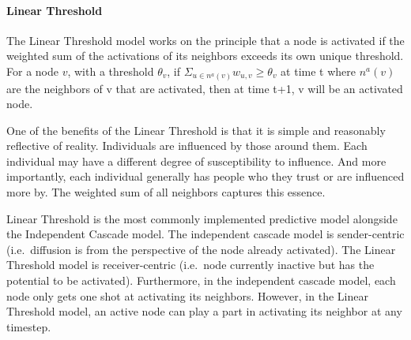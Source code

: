 \documentclass[11pt]{article}
\begin{document}
    \hypertarget{linear-threshold}{%
\paragraph{Linear Threshold}\label{linear-threshold}}

The Linear Threshold model works on the principle that a node is
activated if the weighted sum of the activations of its neighbors
exceeds its own unique threshold. For a node \(v\), with a threshold
\(\theta_v\), if \(\Sigma_{u \in n^a(v)} w_{u,v} \ge \theta_v\) at time
t where \(n^a(v)\) are the neighbors of v that are activated, then at
time t+1, v will be an activated node.

One of the benefits of the Linear Threshold is that it is simple and
reasonably reflective of reality. Individuals are influenced by those
around them. Each individual may have a different degree of
susceptibility to influence. And more importantly, each individual
generally has people who they trust or are influenced more by. The
weighted sum of all neighbors captures this essence.

Linear Threshold is the most commonly implemented predictive model
alongside the Independent Cascade model. The independent cascade model
is sender-centric (i.e.~diffusion is from the perspective of the node
already activated). The Linear Threshold model is receiver-centric
(i.e.~node currently inactive but has the potential to be activated).
Furthermore, in the independent cascade model, each node only gets one
shot at activating its neighbors. However, in the Linear Threshold
model, an active node can play a part in activating its neighbor at any
timestep.
\end{document}
